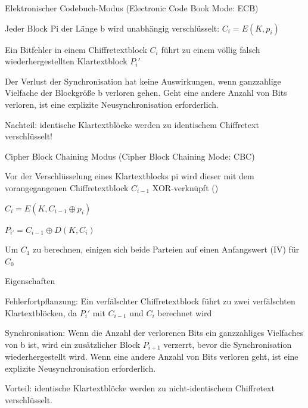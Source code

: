 \documentclass[a4paper]{article}
\begin{document}
\begin{multicols}{3}
      Elektronischer Codebuch-Modus (Electronic Code Book Mode: ECB)

      \begin{itemize*}
            \item Jeder Block Pi der Länge b wird unabhängig verschlüsselt: $C_i =
                  E(K, p_i)$
            \item Ein Bitfehler in einem Chiffretextblock $C_i$ führt zu einem völlig
            falsch wiederhergestellten Klartextblock $P_i'$
            \item Der Verlust der Synchronisation hat keine Auswirkungen, wenn
            ganzzahlige Vielfache der Blockgröße b verloren gehen. Geht eine
            andere Anzahl von Bits verloren, ist eine explizite Neusynchronisation
            erforderlich.
            \item Nachteil: identische Klartextblöcke werden zu identischem Chiffretext
            verschlüsselt!
      \end{itemize*}

      Cipher Block Chaining Modus (Cipher Block Chaining Mode: CBC)

      \begin{itemize*}
            \item Vor der Verschlüsselung eines Klartextblocks pi wird dieser mit dem
            vorangegangenen Chiffretextblock $C_{i-1}$ XOR-verknüpft ()
            \begin{itemize*}
                  \item $C_i = E(K, C_{i-1} \oplus p_i)$
                  \item $P_{i'} = C_{i-1} \oplus D(K, C_i)$
                  \item Um $C_1$ zu berechnen, einigen sich beide Parteien auf einen Anfangswert (IV) für $C_0$
            \end{itemize*}
            \item Eigenschaften
            \begin{itemize*}
                  \item Fehlerfortpflanzung: Ein verfälschter Chiffretextblock führt zu zwei verfälschten Klartextblöcken, da $P_i'$ mit $C_{i-1}$ und $C_i$ berechnet wird
                  \item Synchronisation: Wenn die Anzahl der verlorenen Bits ein ganzzahliges Vielfaches von b ist, wird ein zusätzlicher Block $P_{i+1}$ verzerrt, bevor die Synchronisation wiederhergestellt wird. Wenn eine andere Anzahl von Bits verloren geht, ist eine explizite Neusynchronisation erforderlich.
                  \item Vorteil: identische Klartextblöcke werden zu nicht-identischem Chiffretext verschlüsselt.
            \end{itemize*}
      \end{itemize*}


\end{multicols}
\end{document}
